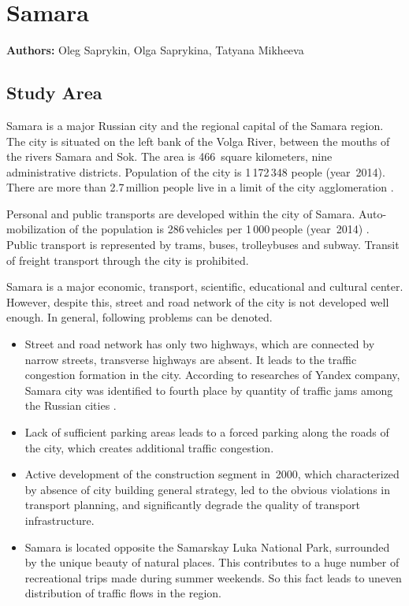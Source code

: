 \chapter{Samara}
\label{ch:samara}
\hfill \textbf{Authors:} Oleg Saprykin, Olga Saprykina, Tatyana Mikheeva

\section{Study Area}
Samara is a major Russian city and the regional capital of the Samara region. The city is situated on the left bank of the Volga River, between the mouths of the rivers Samara and Sok. The area is 466\, square kilometers, nine administrative districts. Population of the city is 1\,172\,348 people (year~2014). There are more than 2.7\,million people live in a limit of the city agglomeration \citep[][]{GKS_2010}.

Personal and public transports are developed within the city of Samara. Auto-mobilization of the population is 286\,vehicles per 1\,000\,people (year~2014) \citep[][]{Gradoteka_2015}. Public transport is represented by trams, buses, trolleybuses and subway. Transit of freight transport through the city is prohibited.

Samara is a major economic, transport, scientific, educational and cultural center. However, despite this, street and road network of the city is not developed well enough. In general, following problems can be denoted.

\begin{itemize}
\item Street and road network has only two highways, which are connected by narrow streets, transverse highways are absent. It leads to the traffic congestion formation in the city. According to researches of Yandex company, Samara city was identified to fourth place by quantity of traffic jams among the Russian cities \citep[][]{Yandex_2013}.
\item Lack of sufficient parking areas leads to a forced parking along the roads of the city, which creates additional traffic congestion.
\item Active development of the construction segment in~2000, which characterized by absence of city building general strategy, led to the obvious violations in transport planning, and significantly degrade the quality of transport infrastructure.
\item Samara is located opposite the Samarskay Luka National Park, surrounded by the unique beauty of natural places. This contributes to a huge number of recreational trips made during summer weekends. So this fact leads to uneven distribution of traffic flows in the region.
\end{itemize}

